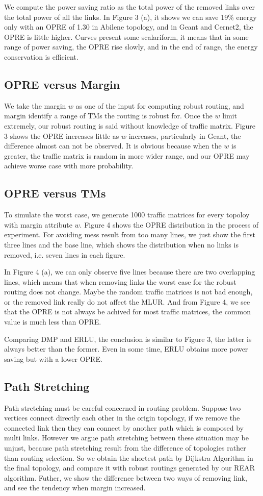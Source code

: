 \documentclass[conference]{IEEEtran}
\begin{document}
We compute the power saving ratio as the total power of the removed links over the total power of all the links.
In Figure 3 (a), it shows we can save 19\% energy only with an OPRE of 1.30 in Abilene topology, and in Geant and Cernet2,
the OPRE is little higher. Curves present some scalariform, it means that in some range of power saving, the OPRE rise slowly,
and in the end of range, the energy conservation is efficient.


\subsection{OPRE versus Margin}
We take the margin $w$ as one of the input for computing robust routing, and margin identify a range of TMs the routing is
robust for. Once the $w$ limit extremely, our robust routing is said without knowledge of traffic matrix. Figure 3 shows the
OPRE increases little as $w$ increases, particularly in Geant, the difference almost can not be observed. It is obvious because
when the $w$ is greater, the traffic matrix is random in more wider range, and our OPRE may achieve worse case with more probability.


\subsection{OPRE versus TMs}
To simulate the worst case, we generate 1000 traffic matrices for every topoloy with margin attribute $w$. Figure 4 shows
the OPRE distribution in the process of experiment. For avoiding mess result from too many lines, we just show the first
three lines and the base line, which shows the distribution when no links is removed, i.e. seven lines in each figure.


In Figure 4 (a), we can only observe five lines because there are two overlapping lines, which means that when removing
links the worst case for the robust routing does not change. Maybe the random traffic matrices is not bad enough, or the
removed link really do not affect the MLUR. And from Figure 4, we see that the OPRE is not always be achived for most
traffic matrices, the common value is much less than OPRE.


Comparing DMP and ERLU, the conclusion is similar to Figure 3, the latter is always better than the former. Even in some
time, ERLU obtains more power saving but with a lower OPRE.

\subsection{Path Stretching}
Path stretching must be careful concerned in routing problem. Suppose two vertices connect directly each other in the origin topology,
if we remove the connected link then they can connect by another path which is composed by multi links. However we argue path stretching
between these situation may be unjust, because path stretching result from the difference of topologies rather than routing selection.
So we obtain the shortest path by Dijkstra Algorithm in the final topology, and compare it with robust routings generated by
our REAR algorithm. Futher, we show the difference between two ways of removing link, and see the tendency when margin increased.
\end{document}
